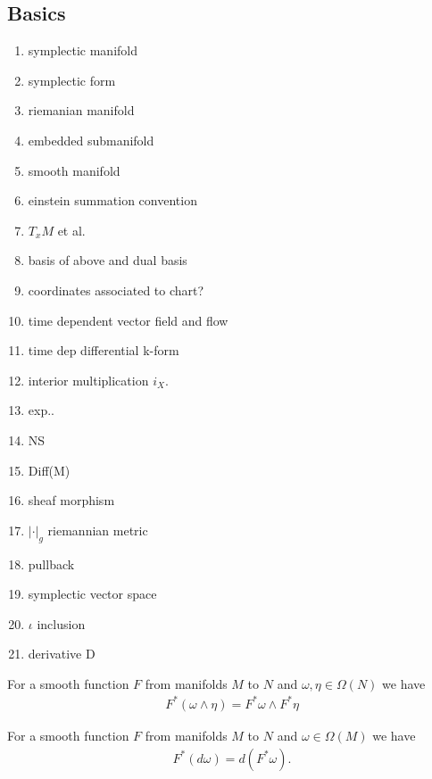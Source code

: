 \begin{appendix}

\section{Basics}

\begin{enumerate}
\item symplectic manifold
\item symplectic form
\item riemanian manifold
\item embedded submanifold
\item smooth manifold
\item einstein summation convention
\item $T_x M$ et al.
\item basis of above and dual basis
\item coordinates associated to chart?
\item time dependent vector field and flow
\item time dep differential k-form
\item interior multiplication $i_X$.
\item exp..
\item NS
\item Diff(M)
\item sheaf morphism
\item $|\cdot |_g$ riemannian metric
\item pullback
\item symplectic vector space
\item $\iota$ inclusion
\item derivative D
\end{enumerate}


\begin{lemma}[refyan E.]
For a smooth function $F$ from manifolds $M$ to $N$ and $\omega,\eta \in \Omega(N)$ we have
\begin{align*}
F^*(\omega \wedge \eta) = F^* \omega \wedge F^* \eta
\end{align*}
\end{lemma}

\begin{lemma}[refyan E.203]
For a smooth function $F$ from manifolds $M$ to $N$ and $\omega \in \Omega(M)$ we have
\begin{align*}
F^*(d\omega) = d(F^* \omega).
\end{align*}
\end{lemma}


\end{appendix}

